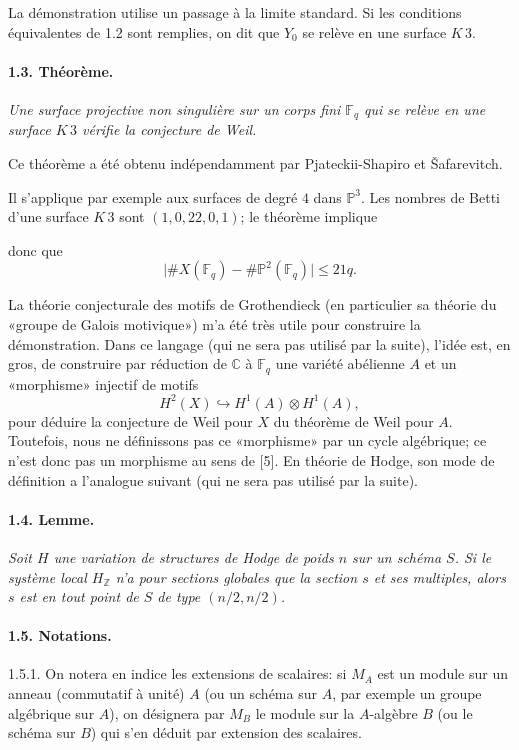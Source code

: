 \documentclass[10pt,leqno]{article}
\newcommand{\C}{\mathbb{C}}
\newcommand{\Z}{\mathbb{Z}}
\newcommand{\Fp}{\mathbb{F}_q}
\newcommand{\into}{\hookrightarrow}
\begin{document}
La démonstration utilise un passage à la limite standard. Si les conditions équivalentes de 1.2 sont remplies, on dit que $Y_0$ se relève en une surface \(K\,3\).

\paragraph{1.3. Théorème.} \emph{Une surface projective non singulière sur un corps fini $\Fp$ qui se relève en une surface \(K\,3\) vérifie la conjecture de Weil.}

Ce théorème a été obtenu indépendamment par Pjateckii-Shapiro et \v{S}afarevitch.

Il s'applique par exemple aux surfaces de degré $4$ dans $\mathbb P^3$. Les nombres de Betti d'une surface \(K\,3\) sont $(1,0,22,0,1)$; le théorème implique

\clearpage

donc que
\[
\bigl|\#X(\Fp)-\#\mathbb P^2(\Fp)\bigr|\le 21q.
\]

La théorie conjecturale des motifs de Grothendieck (en particulier sa théorie du «groupe de Galois motivique») m'a été très utile pour construire la démonstration. Dans ce langage (qui ne sera pas utilisé par la suite), l'idée est, en gros, de construire par réduction de $\C$ à $\Fp$ une variété abélienne $A$ et un «morphisme» injectif de motifs
\[
H^2(X)\into H^1(A)\otimes H^1(A),
\]
pour déduire la conjecture de Weil pour $X$ du théorème de Weil pour $A$. Toutefois, nous ne définissons pas ce «morphisme» par un cycle algébrique; ce n'est donc pas un morphisme au sens de [5]. En théorie de Hodge, son mode de définition a l'analogue suivant (qui ne sera pas utilisé par la suite).

\paragraph{1.4. Lemme.} \emph{Soit $H$ une variation de structures de Hodge de poids $n$ sur un schéma $S$. Si le système local $H_\Z$ n'a pour sections globales que la section $s$ et ses multiples, alors $s$ est en tout point de $S$ de type $(n/2,n/2)$.}

\paragraph{1.5. Notations.} 1.5.1. On notera en indice les extensions de scalaires: si $M_A$ est un module sur un anneau (commutatif à unité) $A$ (ou un schéma sur $A$, par exemple un groupe algébrique sur $A$), on désignera par $M_B$ le module sur la $A$-algèbre $B$ (ou le schéma sur $B$) qui s'en déduit par extension des scalaires.
\end{document}
